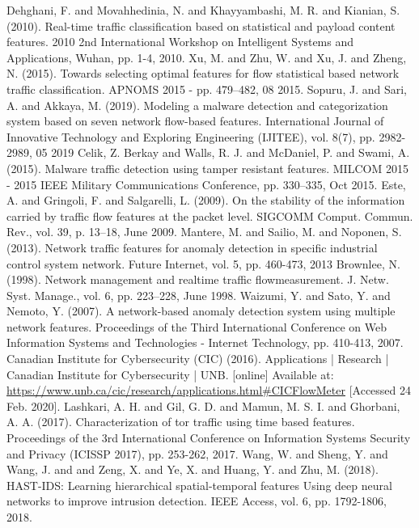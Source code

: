 \documentclass[conference]{IEEEtran}
\begin{document}
\begin{thebibliography}{00}
 Dehghani, F. and Movahhedinia, N. and Khayyambashi, M. R. and Kianian, S. (2010). Real-time traffic classification based on statistical and payload content features. 2010 2nd International Workshop on Intelligent Systems and Applications, Wuhan, pp. 1-4, 2010.
 Xu, M. and Zhu, W. and Xu, J. and Zheng, N. (2015). Towards selecting optimal features for flow statistical based network traffic classification. APNOMS 2015 - pp. 479–482, 08 2015.
 Sopuru, J. and Sari, A. and Akkaya, M. (2019). Modeling a malware detection and categorization system based on seven network flow-based features. International Journal of Innovative Technology and Exploring Engineering (IJITEE), vol. 8(7), pp. 2982-2989, 05 2019
 Celik, Z. Berkay and Walls, R. J. and McDaniel, P. and Swami, A. (2015). Malware traffic detection using tamper resistant features. MILCOM 2015 - 2015 IEEE Military Communications Conference, pp. 330–335, Oct 2015.
 Este, A. and Gringoli, F. and Salgarelli, L. (2009). On the stability of the information carried by traffic flow features at the packet level. SIGCOMM Comput. Commun. Rev., vol. 39, p. 13–18, June 2009.
 Mantere, M. and Sailio, M. and Noponen, S. (2013). Network traffic features for anomaly detection in specific industrial control system network. Future Internet, vol. 5, pp. 460-473, 2013
 Brownlee, N. (1998). Network management and realtime traffic flowmeasurement. J. Netw. Syst. Manage., vol. 6, pp. 223–228, June 1998.
 Waizumi, Y. and Sato, Y. and Nemoto, Y. (2007). A network-based anomaly detection system using multiple network features. Proceedings of the Third International Conference on Web Information Systems and Technologies - Internet Technology, pp. 410-413, 2007.
 Canadian Institute for Cybersecurity (CIC) (2016). Applications | Research | Canadian Institute for Cybersecurity | UNB. [online] Available at: \url{https://www.unb.ca/cic/research/applications.html#CICFlowMeter} [Accessed 24 Feb. 2020].
 Lashkari, A. H. and Gil, G. D. and Mamun, M. S. I. and Ghorbani, A. A. (2017). Characterization of tor traffic using time based features. Proceedings of the 3rd International Conference on Information Systems Security and Privacy (ICISSP 2017), pp. 253-262, 2017.
 Wang, W. and Sheng, Y. and Wang, J. and and Zeng, X. and Ye, X. and Huang, Y. and Zhu, M. (2018). HAST-IDS: Learning hierarchical spatial-temporal features Using deep neural networks to improve intrusion detection. IEEE Access, vol. 6, pp. 1792-1806, 2018.

\end{thebibliography}
\end{document}
